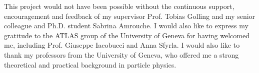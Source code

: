 \documentclass[
11pt, %
english, %
singlespacing, %
headsepline, %
]{MastersDoctoralThesis} %
\begin{document}

\begin{acknowledgements}
\addchaptertocentry{\acknowledgementname} %
This project would not have been possible without the continuous support, encouragement and feedback of my supervisor Prof. Tobias Golling and my senior colleague and Ph.D. student Sabrina Amrouche. I would also like to express my gratitude to the ATLAS group of the University of Geneva for having welcomed me, including Prof. Giuseppe Iacobucci and Anna Sfyrla. I would also like to thank my professors from the University of Geneva, who offered me a strong theoretical and practical background in particle physics. 

\end{acknowledgements}


\tableofcontents %

\listoffigures %

\listoftables %





\end{document}
